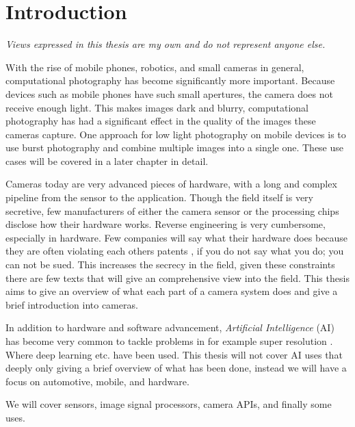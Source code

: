 \chapter{Introduction\label{intro}}
\textit{Views expressed in this thesis are my own and do not represent anyone else.}

With the rise of mobile phones, robotics, and small cameras in general,
computational photography has become significantly more important. Because
devices such as mobile phones have such small apertures, the camera does not
receive enough light. This makes images dark and blurry, computational
photography has had a significant effect in the quality of the images these
cameras capture. One approach for low light photography on mobile devices is
to use burst photography and combine multiple images into a single one. These
use cases will be covered in a later chapter in detail.

Cameras today are very advanced pieces of hardware, with a long and complex
pipeline from the sensor to the application. Though the field itself is very
secretive, few manufacturers of either the camera sensor or the processing
chips disclose how their hardware works. Reverse engineering is very
cumbersome, especially in hardware. Few companies will say what their hardware
does because they are often violating each others patents
\cite{experimentalCompPhot}, if you do not say what you do; you can not be sued.
This increases the secrecy in the field, given these constraints there are few
texts that will give an comprehensive view into the field. This thesis aims to
give an overview of what each part of a camera system does and give a brief
introduction into cameras.

In addition to hardware and software advancement, \textit{Artificial Intelligence} (AI)
has become very common to tackle problems in for example super resolution
\cite{yangDeepLearningSingle2019} \cite{delbracio2021mobile}. Where deep
learning etc. have been used. This thesis will not cover AI uses that deeply
only giving a brief overview of what has been done, instead we will have a
focus on automotive, mobile, and hardware.

We will cover sensors, image signal processors,
camera APIs, and finally some uses.


